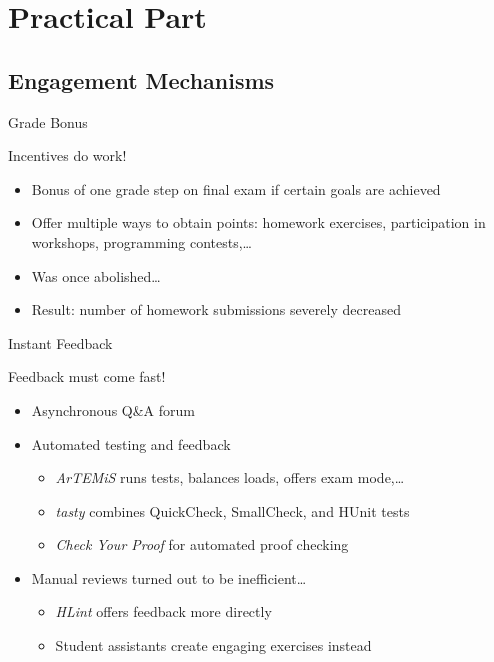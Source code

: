 \documentclass{beamer}
\begin{document}
\section{Practical Part}
\subsection{Engagement Mechanisms}
\begin{frame}{Grade Bonus}
\centerline{\Large{\alert{Incentives do work!}}}
\pause
\begin{itemize}[<+->]
\item Bonus of one grade step on final exam if certain goals are achieved
\item Offer multiple ways to obtain points: homework exercises, participation in workshops, programming contests,\dots
\item Was once abolished\dots\\
\item[] Result: number of homework submissions severely decreased
\end{itemize}
\end{frame}

\begin{frame}{Instant Feedback}
\centerline{\Large{\alert{Feedback must come fast!}}}
\pause
\begin{itemize}[<+->]
\item Asynchronous Q\&A forum
\item Automated testing and feedback
\begin{itemize}
  \item \emph{ArTEMiS} runs tests, balances loads, offers exam mode,\dots
  \item \emph{tasty} combines QuickCheck, SmallCheck, and HUnit tests
  \item \emph{Check Your Proof} for automated proof checking
\end{itemize}
\item Manual reviews turned out to be inefficient\dots
\begin{itemize}
  \item \emph{HLint} offers feedback more directly
  \item Student assistants create engaging exercises instead
\end{itemize}
\end{itemize}
\end{frame}
\end{document}
